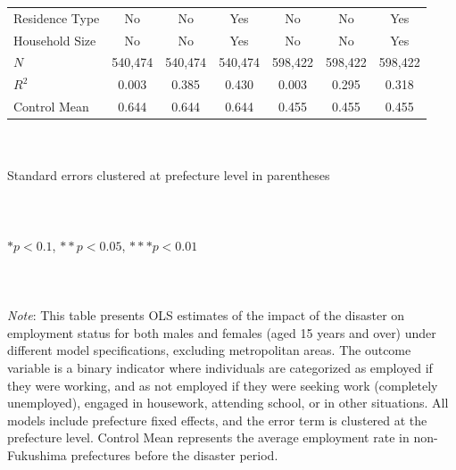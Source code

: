 \documentclass[serif, aspectratio=169]{beamer}
\newcommand{\employmentprobabilitylinks}{%
    \vfill %
    \hfill %
    {\small %
        \hyperlink{employed_placebo}{\beamerbutton{Placebo test}} \,
    }
}
\begin{document}
\begin{frame}[label=employed]
\begin{table}[htbp]
\begin{tabular}{@{}l*{6}{c}@{}}
Residence Type&       No         &       No         &      Yes         &       No         &       No         &      Yes         \\
Household Size&       No         &       No         &      Yes         &       No         &       No         &      Yes         \\
$\textit{N}$&  540,474         &  540,474         &  540,474         &  598,422         &  598,422         &  598,422         \\
$\textit{R}^2$&    0.003         &    0.385         &    0.430         &    0.003         &    0.295         &    0.318         \\
Control Mean&    0.644         &    0.644         &    0.644         &    0.455         &    0.455         &    0.455         \\
\bottomrule
\end{tabular}
\\\\{\linewidth}{\tiny Standard errors clustered at prefecture level in parentheses}\\\\
\\\\{\linewidth}{\tiny $*p<0.1$, $**p<0.05$, $***p<0.01$}\\\\
\\\\{\linewidth}{\tiny \textit{Note}: This table presents OLS estimates of the impact of the disaster on employment status for both males and females (aged 15 years and over) under different model specifications, excluding metropolitan areas. The outcome variable is a binary indicator where individuals are categorized as employed if they were working, and as not employed if they were seeking work (completely unemployed), engaged in housework, attending school, or in other situations. All models include prefecture fixed effects, and the error term is clustered at the prefecture level. Control Mean represents the average employment rate in non-Fukushima prefectures before the disaster period.}
\end{table}

\vspace{-2.2cm}
\employmentprobabilitylinks


\end{frame}


\end{document}
